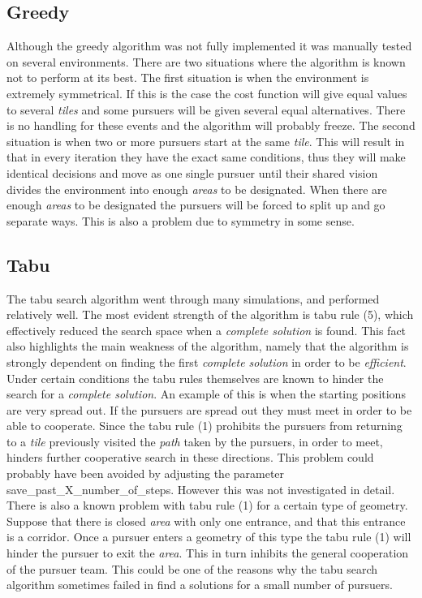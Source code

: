 \subsection{Greedy}
Although the greedy algorithm was not fully implemented it was manually tested on several environments. There are two situations where the algorithm is known not to perform at its best. The first situation is when the environment is extremely symmetrical. If this is the case the cost function will give equal values to several \emph{tiles} and some pursuers will be given several equal alternatives. There is no handling for these events and the algorithm will probably freeze. The second situation is when two or more pursuers start at the same \emph{tile}. This will result in that in every iteration they have the exact same conditions, thus they will make identical decisions and move as one single pursuer until their shared vision divides the environment into enough \emph{areas} to be designated. When there are enough \emph{areas} to be designated the pursuers will be forced to split up and go separate ways. This is also a problem due to symmetry in some sense.
\subsection{Tabu}
The tabu search algorithm went through many simulations, and performed relatively well. The most evident strength of the algorithm is tabu rule (5), which effectively reduced the search space when a \emph{complete solution} is found. This fact also highlights the main weakness of the algorithm, namely that the algorithm is strongly dependent on finding the first \emph{complete solution} in order to be \emph{efficient}. Under certain conditions the tabu rules themselves are known to hinder the search for a \emph{complete solution}. An example of this is when the starting positions are very spread out.  If the pursuers are spread out they must meet in order to be able to cooperate. Since the tabu rule (1) prohibits the pursuers from returning to a \emph{tile} previously visited the \emph{path} taken by the pursuers, in order to meet, hinders further cooperative search in these directions. This problem could probably have been avoided by adjusting the parameter save\_past\_X\_number\_of\_steps. However this was not investigated in detail. There is also a known problem with tabu rule (1) for a certain type of geometry. Suppose that there is closed \emph{area} with only one entrance, and that this entrance is a corridor. Once a pursuer enters a geometry of this type the tabu rule (1) will hinder the pursuer to exit the \emph{area}. This in turn inhibits the general cooperation of the pursuer team. This could be one of the reasons why the tabu search algorithm sometimes failed in find a solutions for a small number of pursuers.

